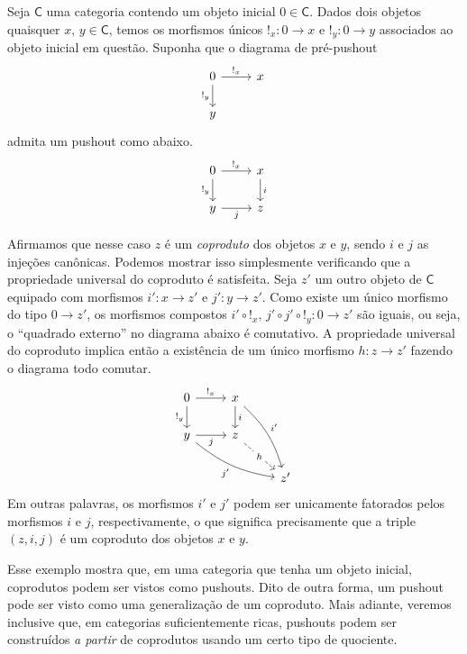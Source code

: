 \begin{exem}
    Seja $\mathsf{C}$ uma categoria contendo um objeto inicial $0 \in \mathsf{C}$.
    Dados dois objetos quaisquer $x,\, y \in \mathsf{C}$, temos os morfismos únicos $!_x: 0 \to x$ e $!_y: 0 \to y$ associados ao objeto inicial em questão.
    Suponha que o diagrama de pré-pushout
    \begin{displaymath}
        \begin{tikzcd}
            0
            \arrow[r, "!_x"]
            \arrow[d, "!_y" swap]
            & x
            \\ y
        \end{tikzcd}
    \end{displaymath}
    admita um pushout como abaixo.
    \begin{displaymath}
        \begin{tikzcd}
            0
            \arrow[r, "!_x"]
            \arrow[d, "!_y" swap]
            & x
            \arrow[d, "i"]
            \\ y
            \arrow[r, "j" swap]
            & z
        \end{tikzcd}
    \end{displaymath}

    Afirmamos que nesse caso $z$ é um \emph{coproduto} dos objetos $x$ e $y$, sendo $i$ e $j$ as injeções canônicas.
    Podemos mostrar isso simplesmente verificando que a propriedade universal do coproduto é satisfeita.
    Seja $z'$ um outro objeto de $\mathsf{C}$ equipado com morfismos $i': x \to z'$ e $j': y \to z'$.
    Como existe um único morfismo do tipo $0 \to z'$, os morfismos compostos $i' \circ !_x,\, j' \circ j' \circ !_y: 0 \to z'$ são iguais, ou seja, o ``quadrado externo'' no diagrama abaixo é comutativo.
    A propriedade universal do coproduto implica então a existência de um único morfismo $h:z \to z'$ fazendo o diagrama todo comutar.
    \begin{displaymath}
        \begin{tikzcd}
            0
            \arrow[r, "!_x"]
            \arrow[d, "!_y" swap]
            & x
            \arrow[d, "i"]
            \arrow[rdd, bend left=15, "i'"]
            \\ y
            \arrow[r, "j" swap]
            \arrow[rrd, bend right=15, "j'" swap]
            & z
            \arrow[rd, dashed, "h" description]
            \\ & & z'
        \end{tikzcd}
    \end{displaymath}
    Em outras palavras, os morfismos $i'$ e $j'$ podem ser unicamente fatorados pelos morfismos $i$ e $j$, respectivamente, o que significa precisamente que a triple $(z,i,j)$ é um coproduto dos objetos $x$ e $y$.

    Esse exemplo mostra que, em uma categoria que tenha um objeto inicial, coprodutos podem ser vistos como pushouts.
    Dito de outra forma, um pushout pode ser visto como uma generalização de um coproduto.
    Mais adiante, veremos inclusive que, em categorias suficientemente ricas, pushouts podem ser construídos \emph{a partir} de coprodutos usando um certo tipo de quociente.
\end{exem}

